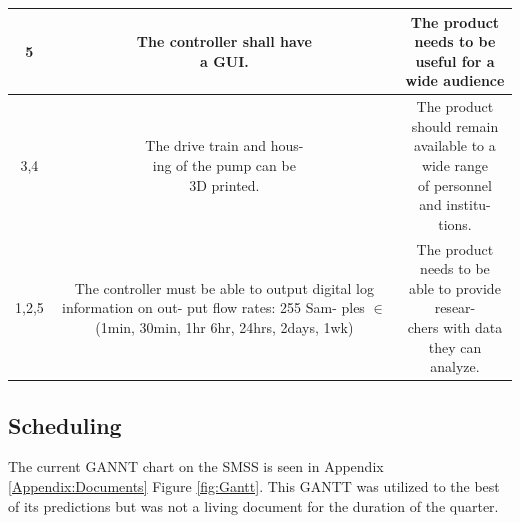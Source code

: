 \documentclass[journal]{IEEEtran}
\begin{document}
\begin{table}[H]
\begin{center}
\begin{tabular}{|c|c|c|}
                     5 & 
                    \makecell[l]{The controller shall have\\
                                 a GUI.} &  
                    \makecell[l]{The product needs to be \\
                                 useful for a wide audience} \\
                    \hline
                    
                    3,4 & 
                    \makecell[l]{The drive train and hous-\\
                                 ing of the pump can be \\
                                 3D printed.} &  
                    \makecell[l]{The product should remain\\
                                 available to a wide range\\
                                 of personnel and institu-\\
                                 tions.} \\
                    \hline
                    
                    1,2,5 & 
                    \makecell[l]{The controller must be \\
                                 able to output digital \\
                                 log information on out-\\
                                 put flow rates: 255 Sam-\\
                                 ples $\in$ (1min, 30min, 1hr\\
                                 6hr, 24hrs, 2days, 1wk)} &  
                    \makecell[l]{The product needs to be \\
                                 able to provide resear-\\
                                 chers with data they can\\
                                 analyze.} \\
                    \hline
                    
    
                \end{tabular}
            \end{center}
        \end{table}
        
    \subsection{Scheduling}
        The current GANNT chart on the SMSS is seen in Appendix \ref{Appendix:Documents} Figure \ref{fig:Gantt}. This GANTT was utilized to the best of its predictions but was not a living document for the duration of the quarter. 
        
\end{document}
